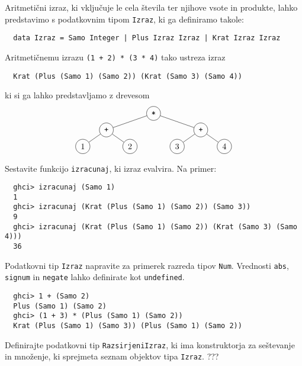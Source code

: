 \documentclass[arhiv]{../izpit}
\begin{document}


Aritmetični izraz, ki vključuje le cela števila ter njihove vsote in produkte,
lahko predstavimo s podatkovnim tipom \texttt{Izraz}, ki ga definiramo takole:
\begin{verbatim}
  data Izraz = Samo Integer | Plus Izraz Izraz | Krat Izraz Izraz
\end{verbatim}
Aritmetičnemu izrazu \texttt{(1 + 2) * (3 * 4)} tako ustreza izraz
\begin{verbatim}
  Krat (Plus (Samo 1) (Samo 2)) (Krat (Samo 3) (Samo 4))
\end{verbatim}
ki si ga lahko predstavljamo z drevesom
\[
  \begin{tikzpicture}[level distance=0.7cm,
    level 1/.style={sibling distance=4cm},
    level 2/.style={sibling distance=2cm},
    level 3/.style={sibling distance=2cm}
    ]
    \node[circle, draw] {\texttt{*}}
      child {node[circle, draw] {\texttt{+}}
        child {node[circle, draw] {1}}
        child {node[circle, draw] {2}}
      }
      child {node[circle, draw] {\texttt{+}}
        child {node[circle, draw] {3}}
        child {node[circle, draw] {4}}
      };
  \end{tikzpicture}
\]

\podnaloga
  Sestavite funkcijo \texttt{izracunaj}, ki izraz evalvira. Na primer:
  \begin{verbatim}
  ghci> izracunaj (Samo 1)
  1
  ghci> izracunaj (Krat (Plus (Samo 1) (Samo 2)) (Samo 3))
  9
  ghci> izracunaj (Krat (Plus (Samo 1) (Samo 2)) (Krat (Samo 3) (Samo 4)))
  36
  \end{verbatim}

\podnaloga
  Podatkovni tip \texttt{Izraz} napravite za primerek razreda tipov \texttt{Num}.
  Vrednosti \texttt{abs}, \texttt{signum} in \texttt{negate} lahko definirate kot \texttt{undefined}.
  \begin{verbatim}
  ghci> 1 + (Samo 2)
  Plus (Samo 1) (Samo 2)
  ghci> (1 + 3) * (Plus (Samo 1) (Samo 2))
  Krat (Plus (Samo 1) (Samo 3)) (Plus (Samo 1) (Samo 2))
  \end{verbatim}

\podnaloga
  Definirajte podatkovni tip \texttt{RazsirjeniIzraz}, ki ima konstruktorja
  za seštevanje in množenje, ki sprejmeta seznam objektov tipa \texttt{Izraz}.
  ???
\end{document}
